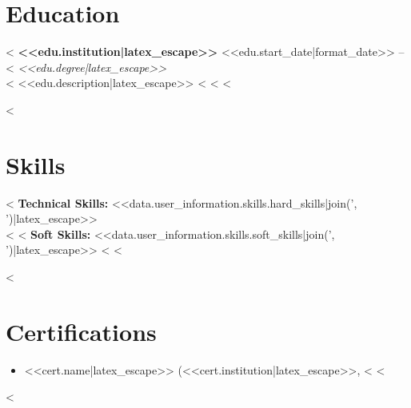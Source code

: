 \documentclass[letterpaper,11pt]{article}
\begin{document}
\section*{Education}
<%
\textbf{<<edu.institution|latex_escape>>} \hfill <<edu.start_date|format_date>> -- <%
\textit{<<edu.degree|latex_escape>>} \\
<%
<<edu.description|latex_escape>>
<%
<%
<%

<%
\section*{Skills}
<%
\textbf{Technical Skills:} <<data.user_information.skills.hard_skills|join(', ')|latex_escape>> \\
<%
<%
\textbf{Soft Skills:} <<data.user_information.skills.soft_skills|join(', ')|latex_escape>>
<%
<%

<%
\section*{Certifications}
\begin{itemize}
    <%
    \item <<cert.name|latex_escape>> (<<cert.institution|latex_escape>>, <%
    <%
\end{itemize}
<%
\end{document}
